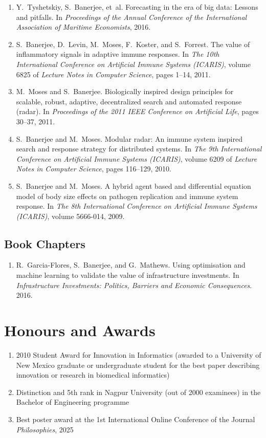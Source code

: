 \documentclass[11pt,a4paper]{article}
\begin{document}
\begin{enumerate}
  \item Y.~Tyshetskiy, S.~Banerjee, et~al. Forecasting in the era of big data: Lessons and pitfalls. In {\em Proceedings of the Annual Conference of the International Association of Maritime Economists}, 2016.
  \item S.~Banerjee, D.~Levin, M.~Moses, F.~Koster, and S.~Forrest. The value of inflammatory signals in adaptive immune responses. In {\em The 10th International Conference on Artificial Immune Systems (ICARIS)}, volume 6825 of {\em Lecture Notes in Computer Science}, pages 1--14, 2011.
  \item M.~Moses and S.~Banerjee. Biologically inspired design principles for scalable, robust, adaptive, decentralized search and automated response (radar). In {\em Proceedings of the 2011 IEEE Conference on Artificial Life}, pages 30--37, 2011.
  \item S.~Banerjee and M.~Moses. Modular radar: An immune system inspired search and response strategy for distributed systems. In {\em The 9th International Conference on Artificial Immune Systems (ICARIS)}, volume 6209 of {\em Lecture Notes in Computer Science}, pages 116--129, 2010.
  \item S.~Banerjee and M.~Moses. A hybrid agent based and differential equation model of body size effects on pathogen replication and immune system response. In {\em The 8th International Conference on Artificial Immune Systems (ICARIS)}, volume 5666-014, 2009.
\end{enumerate}

\subsection*{Book Chapters}
\begin{enumerate}
  \item R.~Garcia-Flores, S.~Banerjee, and G.~Mathews. Using optimisation and machine learning to validate the value of infrastructure investments. In {\em Infrastructure Investments: Politics, Barriers and Economic Consequences}. 2016.
\end{enumerate}

\section*{Honours and Awards}
\begin{enumerate}
  \item 2010 Student Award for Innovation in Informatics (awarded to a University of New Mexico graduate or undergraduate student for the best paper describing innovation or research in biomedical informatics)
  \item Distinction and 5th rank in Nagpur University (out of 2000 examinees) in the Bachelor of Engineering programme
  \item Best poster award at the 1st International Online Conference of the Journal \textit{Philosophies}, 2025
\end{enumerate}
\end{document}
